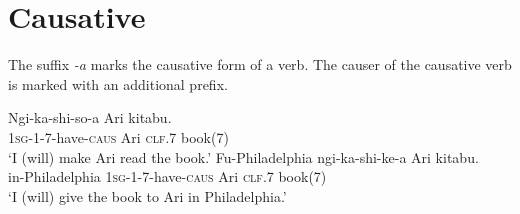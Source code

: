 \documentclass[12pt, oneside]{article}
\let\ipa\textipa
\begin{document}
\section{Causative}
The suffix \textit{-\textbeltl a} marks the causative form of a verb. The causer of the causative verb is marked with an additional prefix.

\begin{exe}
\ex
\gll Ngi-ka-shi-so-\ipa{\textbeltl}a Ari \ipa{nta\textbeltl o} kitabu. \\
\textsc{1sg}-\textsc{1}-\textsc{7}-have-\textsc{caus} Ari \textsc{clf}.7 book(7) \\
\trans `I (will) make Ari read the book.'
\ex
\gll Fu-Philadelphia ngi-ka-shi-ke-\ipa{\textbeltl}a Ari \ipa{nta\textbeltl o} kitabu. \\
in-Philadelphia \textsc{1sg}-\textsc{1}-\textsc{7}-have-\textsc{caus} Ari \textsc{clf}.7 book(7) \\
\trans `I (will) give the book to Ari in Philadelphia.'
\end{exe}
\end{document}

